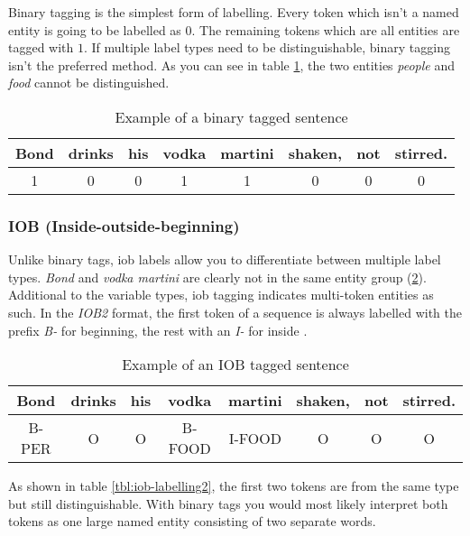 Binary tagging is the simplest form of labelling. Every token which isn't a named entity is going to be labelled as $0$. The remaining
tokens which are all entities are tagged with $1$. If multiple label types need to be distinguishable, binary tagging isn't the preferred
method. As you can see in table \ref{tbl:binary-labelling}, the two entities \emph{people} and \emph{food} cannot be distinguished.

\begin{table}[h!]
    \centering
    \begin{tabular}{|c|c|c|c|c|c|c|c|}
        \hline
        Bond & drinks & his & vodka & martini & shaken, & not & stirred. \\
        \hline
        1 & 0 & 0 & 1 & 1 & 0 & 0 & 0 \\
        \hline
    \end{tabular}
    \caption{Example of a binary tagged sentence}
    \label{tbl:binary-labelling}
\end{table}

\subsubsection{IOB (Inside-outside-beginning)}

Unlike binary tags, \acrshort{iob} labels allow you to differentiate between multiple label types. \emph{Bond} and \emph{vodka martini}
are clearly not in the same entity group (\ref{tbl:iob-labelling}). Additional to the variable types, \acrshort{iob} tagging indicates
multi-token entities as such. In the \emph{IOB2} format, the first token of a sequence is always labelled with the prefix \emph{B-} for
beginning, the rest with an \emph{I-} for inside \cite{bio95}.

\begin{table}[h!]
    \centering
    \begin{tabular}{|c|c|c|c|c|c|c|c|}
        \hline
        Bond & drinks & his & vodka & martini & shaken, & not & stirred. \\
        \hline
        B-PER & O & O & B-FOOD & I-FOOD & O & O & O \\
        \hline
    \end{tabular}
    \caption{Example of an IOB tagged sentence}
    \label{tbl:iob-labelling}
\end{table}

As shown in table \ref{tbl:iob-labelling2}, the first two tokens are from the same type but still distinguishable. With binary tags you
would most likely interpret both tokens as one large named entity consisting of two separate words.

